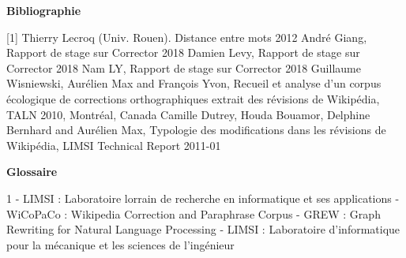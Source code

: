 \documentclass[11pt]{article}
\begin{document}
\cleardoublepage

\begin{center}
{\bfseries \huge Bibliographie}
\end{center}
\vspace*{35mm}
[1] Thierry Lecroq (Univ. Rouen). Distance entre mots 2012
\newline
\newline
[2] Andr\'{e} Giang, Rapport de stage sur Corrector 2018
\newline
\newline
[3] Damien Levy, Rapport de stage sur Corrector 2018
\newline
\newline
[4] Nam LY, Rapport de stage sur Corrector 2018
\newline
\newline
[5] Guillaume Wisniewski, Aur\'{e}lien Max and Fran\c{c}ois Yvon, Recueil et analyse d'un corpus \'{e}cologique de corrections orthographiques extrait des r\'{e}visions de Wikip\'{e}dia, TALN 2010, Montr\'{e}al, Canada
\newline
\newline
[6] Camille Dutrey, Houda Bouamor, Delphine Bernhard and Aur\'{e}lien Max, Typologie des modifications dans les r\'{e}visions de Wikip\'{e}dia, LIMSI Technical Report 2011-01
\newline
\newline

\cleardoublepage





\begin{center}
{\bfseries \huge Glossaire}
\end{center}
\vspace*{35mm}
1 - LIMSI : Laboratoire lorrain de recherche en informatique et ses applications
\newline
{} - WiCoPaCo : Wikipedia Correction and Paraphrase Corpus
\newline
{} - GREW : Graph Rewriting for Natural Language Processing
\newline
{} - LIMSI : Laboratoire d'informatique pour la m\'{e}canique et les sciences de l'ing\'{e}nieur
\newline
\newline
\cleardoublepage
\end{document}
